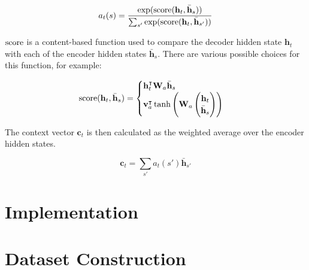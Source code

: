 \begin{equation*}
  a_t(s) = \frac
            {\exp(\operatorname{score}(\mathbf{h}_t, \bar{\mathbf{h}}_s))}
            {\sum_{s'} \exp(\operatorname{score}(\mathbf{h}_t, \bar{\mathbf{h}}_{s'}))}
\end{equation*}

\(\operatorname{score}\) is a content-based function used to compare the decoder hidden state \(\mathbf{h}_t\) with each of the encoder hidden states \(\bar{\mathbf{h}}_s\). There are various possible choices for this function, for example:

\begin{equation*}
  \operatorname{score}(\mathbf{h}_t, \bar{\mathbf{h}}_s) =
  \begin{cases}
    \mathbf{h}_t^\intercal \mathbf{W}_a \bar{\mathbf{h}}_s \\
    \mathbf{v}_a^\intercal \tanh \left(\mathbf{W}_a \begin{pmatrix} \mathbf{h}_t \\ \bar{\mathbf{h}}_s \end{pmatrix} \right)
  \end{cases}
\end{equation*}

The context vector \(\mathbf{c}_t\) is then calculated as the weighted average over the encoder hidden states.

\begin{equation*}
  \mathbf{c}_t = \sum_{s'} a_t(s') \bar{\mathbf{h}}_{s'}
\end{equation*}

\section{Implementation}

\section{Dataset Construction}
